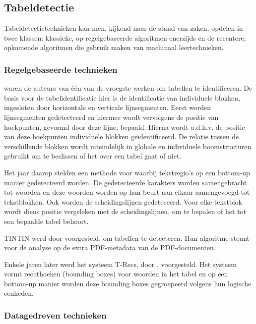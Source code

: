 \subsection{Tabeldetectie}
\label{subsec:tabel-detectie}

Tabeldetectietechnieken kan men, kijkend naar de stand van zaken, opdelen in twee klassen: klassieke, op regelgebaseerde algoritmen enerzijds en de recentere, opkomende algoritmen die gebruik maken van machinaal leertechnieken.

\subsubsection{Regelgebaseerde technieken}

\textcite{Watanabe1991} waren de auteurs van één van de vroegste werken om tabellen te identificeren. De basis voor de tabelidentificatie hier is de identificatie van individuele blokken, ingesloten door horizontale en verticale lijnsegmenten. Eerst worden lijnsegmenten gedetecteerd en hiermee wordt vervolgens de positie van hoekpunten, gevormd door deze lijne, bepaald. Hierna wordt a.d.h.v. de positie van deze hoekpunten individuele blokken geïdentificeerd. De relatie tussen de verschillende blokken wordt uiteindelijk in globale en individuele boomstructuren gebruikt om te beslissen of het over een tabel gaat of niet.

Het jaar daarop stelden \textcite{Laurentini1992} een methode voor waarbij tekstregio's op een bottom-up manier gedetecteerd worden. De gedetecteerde karakters worden samengebracht tot woorden en deze woorden worden op hun beurt aan elkaar samengevoegd tot tekstblokken. Ook worden de scheidingslijnen gedeteceerd. Voor elke tekstblok wordt diens positie vergeleken met de scheidingslijnen, om te bepalen of het tot een bepaalde tabel behoort.

TINTIN werd door \textcite{Pyreddy1997} voorgesteld, om tabellen te detecteren. Hun algoritme steunt voor de analyse op de extra PDF-metadata van de PDF-documenten.

Enkele jaren later werd het systeem T-Recs, door \textcite{Kieninger2001}, voorgesteld. Het systeem vormt rechthoeken (bounding boxes) voor woorden in het tabel en op een bottom-up manier worden deze bounding boxes gegroepeerd volgens hun logische eenheden. 

\subsubsection{Datagedreven technieken}

